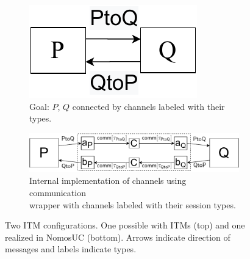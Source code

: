 \begin{figure}
	\begin{subfigure}{0.5\textwidth}
	\begin{center}
	\includegraphics[scale=0.5]{figures/p_and_q.pdf}
	\caption{Goal: $P$, $Q$ connected by channels labeled with their types.}
	\label{fig:pandq}
	\end{center}
	\vspace{0.1em}
	\end{subfigure}
	\begin{subfigure}{0.5\textwidth}
	\begin{center}
	\includegraphics[scale=0.4]{figures/newPandQ.pdf}
	\caption{Internal implementation of channels using communication\\wrapper
	with channels labeled with their session types.}
	\label{fig:newpandq}
	\end{center}
	\end{subfigure}
	\caption{Two ITM configurations. One possible with ITMs (top) and one realized in NomosUC (bottom). Arrows indicate direction of messages
	and labels indicate types.}
	\vspace{-1em}
\end{figure}

